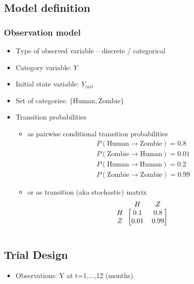 \subsection*{Model definition}
\subsubsection*{Observation model}

\begin{itemize}
\item
Type of observed variable -- discrete / categorical
\item
Category variable: $Y$
\item
Initial state variable: $Y_{init}$
\item
Set of categories: $\{\mbox{Human}, \mbox{Zombie}\}$
\item
Transition probabilities
\begin{itemize}
\item
as pairwise conditional transition probabilities
\begin{align}
& P(\mbox{Human} \rightarrow \mbox{Zombie}) = 0.8 \nonumber \\
& P(\mbox{Zombie} \rightarrow \mbox{Human}) = 0.01 \nonumber \\
& P(\mbox{Human} \rightarrow \mbox{Human}) = 0.2 \nonumber \\
& P(\mbox{Zombie} \rightarrow \mbox{Zombie}) = 0.99 \nonumber
\end{align}
\item
or as transition (aka stochastic) matrix
\[
\begin{blockarray}{ccc}
& H & Z \\
\begin{block}{c[cc]}
H &    0.1 & 0.8  \\
Z &    0.01 & 0.99  \\
\end{block}
\end{blockarray}
\]
\end{itemize}
\end{itemize}

\subsection*{Trial Design}

\begin{itemize}
\item
Observations: Y at t=1,...,12 (months).
\end{itemize}


